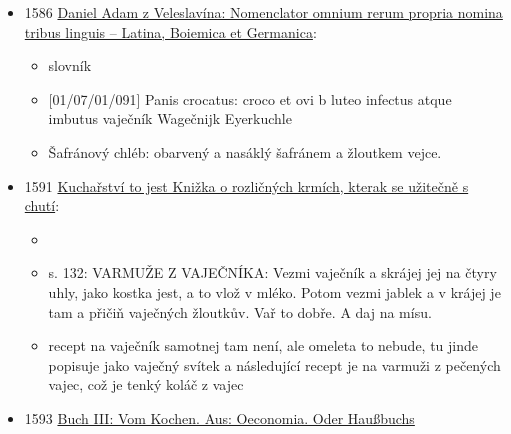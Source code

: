 \begin{itemize}
\begin{itemize}
    \begin{itemize}
    \tightlist
    \item
      vnd gehet der Mann fornen naus / so gehet sie hinden naus / zum
      Krahles / für die Wochen / zum Spießkuchen 3 / fauffen einander
      ein Plessch Bier zu / wil eis ne nicht bescheid thun / so bringet
      eine der andern einen Kayentrunck
    \item
      a když muž přijede, ona odejde, a když muž odejde předními dveřmi,
      ona odejde zadními dveřmi, do krámu, na týdenní nákupy, na špízový
      koláč, pijí spolu džbánek piva, když se jedna nechce podělit,
      druhá jí přinese kajenský nápoj.
    \end{itemize}
  \end{itemize}
\item
  1586
  \href{https://bara.ujc.cas.cz/slovniky/velnom/velnom7.html\#CTX1229}{Daniel
  Adam z Veleslavína: Nomenclator omnium rerum propria nomina tribus
  linguis -- Latina, Boiemica et Germanica}:

  \begin{itemize}
  \tightlist
  \item
    slovník
  \item
    {[}01/07/01/091{]} Panis crocatus: croco et ovi b luteo infectus
    atque imbutus \textbar{} vaječník \textbar{} Wagečnijk \textbar{}
    Eyerkuchle
  \item
    Šafránový chléb: obarvený a nasáklý šafránem a žloutkem vejce.
  \end{itemize}
\item
  1591
  \href{https://ndk.cz/uuid/uuid:27bccb70-88d6-11e3-997d-005056827e52}{Kuchařství
  to jest Knižka o rozličných krmích, kterak se užitečně s chutí}:

  \begin{itemize}
  \tightlist
  \item
  \item
    s. 132: VARMUŽE Z VAJEČNÍKA: Vezmi vaječník a skrájej jej na čtyry
    uhly, jako kostka jest, a to vlož v mléko. Potom vezmi jablek a v
    krájej je tam a přičiň vaječných žloutkův. Vař to dobře. A daj na
    mísu.
  \item
    recept na vaječník samotnej tam není, ale omeleta to nebude, tu
    jinde popisuje jako vaječný svítek a následující recept je na
    varmuži z pečených vajec, což je tenký koláč z vajec
  \end{itemize}
\item
  1593
  \href{https://www.deutschestextarchiv.de/book/view/coler_kochbuch_1593/?hl=Spi\%C3\%9Fkuchen&p=85}{Buch
  III: Vom Kochen. Aus: Oeconomia. Oder Haußbuchs}


\end{itemize}
